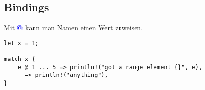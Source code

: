 \subsection{Bindings}
Mit \textcolor{blue}{\textbf{@}} kann man Namen einen Wert zuweisen.
\begin{lstlisting}
let x = 1;

match x {
    e @ 1 ... 5 => println!("got a range element {}", e),
    _ => println!("anything"),
}
\end{lstlisting}